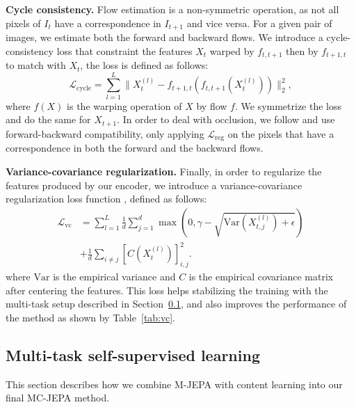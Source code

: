 \documentclass{article} %
\newcommand{\algospace}{MC-JEPA }
\newcommand{\parspace}{\vspace{0mm}}
\begin{document}
\noindent\textbf{Cycle consistency.} Flow estimation is a non-symmetric operation, as not all pixels of $I_{t}$ have a correspondence in $I_{t+1}$ and vice versa. For a given pair of images, we estimate both the forward and backward flows. We introduce a cycle-consistency loss that constraint the features $X_{t}$ warped by $f_{t,t+1}$ then by $f_{t+1,t}$ to match with $X_{t}$, the loss is defined as follows:
\begin{equation} \label{eq:cycle_loss}
    \mathcal{L}_{\mathrm{cycle}} = \sum_{l=1}^{L} \| X_{t}^{(l)} - f_{t+1,t}(f_{t,t+1}(X_{t}^{(l)})) \|_2^2,
\end{equation}
 where $f(X)$ is the warping operation of $X$ by flow $f$. We symmetrize the loss and do the same for $X_{t+1}$. In order to deal with occlusion, we follow \citep{lui2019ddflow} and use forward-backward compatibility, only applying $\mathcal{L}_{\mathrm{reg}}$ on the pixels that have a correspondence in both the forward and the backward flows.
 \parspace
 
 \noindent\textbf{Variance-covariance regularization.} Finally, in order to regularize the features produced by our encoder, we introduce a variance-covariance regularization loss function \citep{bardes2022vicreg}, defined as follows:
\begin{equation} \label{eq:vc_loss}
\begin{split}
\mathcal{L}_{\mathrm{vc}} & = \sum_{l=1}^{L} \frac{1}{d} \sum_{j=1}^{d} \max(0, \gamma - \sqrt{\mathrm{Var}(X_{t,j}^{(l)}) + \epsilon}) \\
& + \frac{1}{d} \sum_{i \ne j} [C(X_{t}^{(l)})]_{i,j}^2.
\end{split}
\end{equation}
where $\mathrm{Var}$ is the empirical variance and $C$ is the empirical covariance matrix after centering the features. This loss helps stabilizing the training with the multi-task setup described in Section~\ref{sec:multi_task}, and also improves the performance of the method as shown by Table~\ref{tab:vc}.

\subsection{Multi-task self-supervised learning} \label{sec:multi_task}

This section describes how we combine M-JEPA with content learning into our final \algospace method. \parspace
\end{document}
